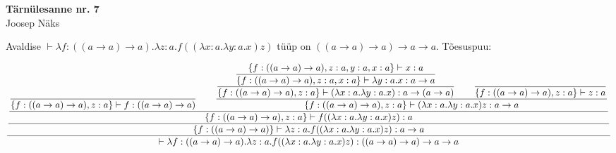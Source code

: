\documentclass{article}
\begin{document}
\begin{center}
\Large\textbf{T\"arn\"ulesanne nr. 7}\\
\small{Joosep N\"aks}
\end{center}
\begin{center}
Avaldise $\vdash\lambda f:((a\to a)\to a).\lambda z:a.f((\lambda x:a.\lambda y:a.x)z)$ t\"u\"up on $((a\to a)\to a)\to a\to a$. T\~oesuspuu:
\end{center}
\begin{gather*}
\dfrac{ 
 \dfrac{
  \dfrac{
   \dfrac{
    \null
   }{
    \{f:((a\to a)\to a),z:a\}\vdash f:((a\to a)\to a)
   }
   \qquad
   \dfrac{
    \dfrac{
     \dfrac{
      \{f:((a\to a)\to a),z:a,y:a,x:a\}\vdash x:a
     }{
      \{f:((a\to a)\to a),z:a,x:a\}\vdash \lambda y:a.x:a\to a
     }
    }{
     \{f:((a\to a)\to a),z:a\}\vdash (\lambda x:a.\lambda y:a.x):a\to (a\to a)
    }
    \qquad
    \dfrac{
     \null
    }{
     \{f:((a\to a)\to a),z:a\}\vdash z:a
    }
   }{
    \{f:((a\to a)\to a),z:a\}\vdash (\lambda x:a.\lambda y:a.x)z:a\to a
   }
  }{
   \{f:((a\to a)\to a),z:a\}\vdash f((\lambda x:a.\lambda y:a.x)z):a
  }
 }{
  \{f:((a\to a)\to a)\}\vdash\lambda z:a.f((\lambda x:a.\lambda y:a.x)z):a\to a
 }
}{
 \vdash\lambda f:((a\to a)\to a).\lambda z:a.f((\lambda x:a.\lambda y:a.x)z):((a\to a)\to a)\to a\to a
}
\end{gather*}
\end{document}
